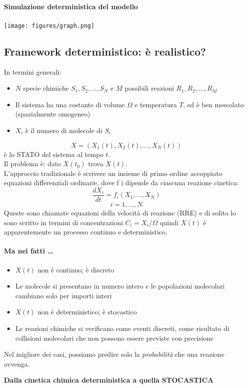 \documentclass{article}
\begin{document}
\paragraph{Simulazione deterministica del modello}
\begin{center}
    \texttt{[image: figures/graph.png]}
\end{center}
\subsection{Framework deterministico: è realistico?}
In termini generali:
\begin{itemize}
    \item $N$ specie chimiche $S_1, S_2, \dots, S_N$ e $M$ possibili reazioni $R_1, R_2, \dots, R_M$
    \item Il sistema ha una costante di volume $\Omega$ e temperatura $T$, ed è ben mescolato (spazialmente omogeneo)
    \item $X_i$ è il numero di molecole di $S_i$
\end{itemize}
$$ X = (X_1(t),X_2(t), \dots, X_N(t))$$
è lo STATO del sistema al tempo $t$.\\
Il problema è: dato $X(t_0)$ trova $X(t)$.\\
L'approccio tradizionale è scrivere un insieme di primo ordine accoppiato
equazioni differenziali ordinarie, dove f i dipende da ciascuna reazione
cinetica:
$$ \frac{dX_i}{dt} = f_i(X_1, \dots, X_N)$$ 
$$i = 1, \dots, N$$
Queste sono chiamate equazioni della velocità di reazione (RRE) e di solito lo sono
scritto in termini di concentrazioni $C_i = X_i / \Omega$ quindi $X(t)$ è apparentemente un processo continuo e deterministico.\\
\paragraph{Ma nei fatti \dots}
\begin{itemize}
    \item $X(t)$ non è continuo; è discreto
    \item Le molecole si presentano in numero intero e le popolazioni molecolari cambiano
    solo per importi interi
    \item $X(t)$ non è deterministico; è stocastico
    \item Le reazioni chimiche si verificano come eventi discreti, come risultato di
    collisioni molecolari che non possono essere previste con precisione
\end{itemize}
Nel migliore dei casi, possiamo predire solo la \textit{probabilità} che una reazione avvenga.
\begin{center}
    \textbf{Dalla cinetica chimica deterministica a quella STOCASTICA}
\end{center}
\end{document}
